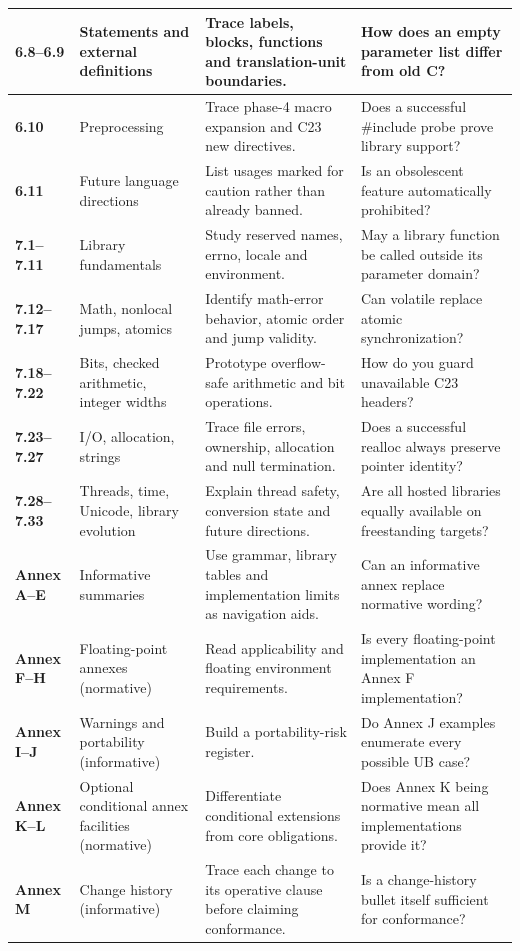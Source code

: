 \documentclass[10pt,letterpaper,oneside]{report}
\begin{document}
\begin{longtable}{p{.11\linewidth}p{.19\linewidth}p{.34\linewidth}p{.24\linewidth}}
\textbf{6.8--6.9} & Statements and external definitions & Trace labels, blocks, functions and translation-unit boundaries. & How does an empty parameter list differ from old C?\\\hline
\textbf{6.10} & Preprocessing & Trace phase-4 macro expansion and C23 new directives. & Does a successful \#include probe prove library support?\\\hline
\textbf{6.11} & Future language directions & List usages marked for caution rather than already banned. & Is an obsolescent feature automatically prohibited?\\\hline
\textbf{7.1--7.11} & Library fundamentals & Study reserved names, errno, locale and environment. & May a library function be called outside its parameter domain?\\\hline
\textbf{7.12--7.17} & Math, nonlocal jumps, atomics & Identify math-error behavior, atomic order and jump validity. & Can volatile replace atomic synchronization?\\\hline
\textbf{7.18--7.22} & Bits, checked arithmetic, integer widths & Prototype overflow-safe arithmetic and bit operations. & How do you guard unavailable C23 headers?\\\hline
\textbf{7.23--7.27} & I/O, allocation, strings & Trace file errors, ownership, allocation and null termination. & Does a successful realloc always preserve pointer identity?\\\hline
\textbf{7.28--7.33} & Threads, time, Unicode, library evolution & Explain thread safety, conversion state and future directions. & Are all hosted libraries equally available on freestanding targets?\\\hline
\textbf{Annex A--E} & Informative summaries & Use grammar, library tables and implementation limits as navigation aids. & Can an informative annex replace normative wording?\\\hline
\textbf{Annex F--H} & Floating-point annexes (normative) & Read applicability and floating environment requirements. & Is every floating-point implementation an Annex F implementation?\\\hline
\textbf{Annex I--J} & Warnings and portability (informative) & Build a portability-risk register. & Do Annex J examples enumerate every possible UB case?\\\hline
\textbf{Annex K--L} & Optional conditional annex facilities (normative) & Differentiate conditional extensions from core obligations. & Does Annex K being normative mean all implementations provide it?\\\hline
\textbf{Annex M} & Change history (informative) & Trace each change to its operative clause before claiming conformance. & Is a change-history bullet itself sufficient for conformance?\\\hline
\bottomrule\end{longtable}\normalsize
\end{document}
